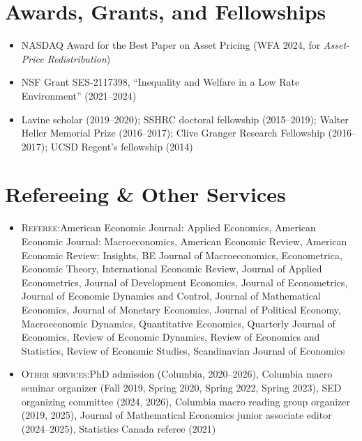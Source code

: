 \documentclass[a4paper,10pt]{article}
\newcommand{\note}[1]{\par\nopagebreak{\small\leftskip=1em #1\par}}
\begin{document}
\section*{Awards, Grants, and Fellowships}
\begin{itemize}[itemsep=4pt]
  \item NASDAQ Award for the Best Paper on Asset Pricing (WFA 2024, for \textit{Asset-Price Redistribution})
  \item NSF Grant SES-2117398, ``Inequality and Welfare in a Low Rate Environment'' (2021--2024)
        \note{with co-PI Matthieu Gomez}
  \item Lavine scholar (2019--2020); SSHRC doctoral fellowship (2015--2019); Walter Heller Memorial Prize (2016--2017); Clive Granger Research Fellowship (2016--2017); UCSD Regent's fellowship (2014)
\end{itemize}

\section*{Refereeing \& Other Services}
\begin{itemize}[itemsep=4pt]
  \item \textsc{Referee:}\enspace American Economic Journal: Applied Economics, American Economic Journal: Macroeconomics, American Economic Review, American Economic Review: Insights, BE Journal of Macroeconomics, Econometrica, Economic Theory, International Economic Review, Journal of Applied Econometrics, Journal of Development Economics, Journal of Econometrics, Journal of Economic Dynamics and Control, Journal of Mathematical Economics, Journal of Monetary Economics, Journal of Political Economy, Macroeconomic Dynamics, Quantitative Economics, Quarterly Journal of Economics, Review of Economic Dynamics, Review of Economics and Statistics, Review of Economic Studies, Scandinavian Journal of Economics
  \item \textsc{Other services:}\enspace PhD admission (Columbia, 2020--2026), Columbia macro seminar organizer (Fall 2019, Spring 2020, Spring 2022, Spring 2023), SED organizing committee (2024, 2026), Columbia macro reading group organizer (2019, 2025), Journal of Mathematical Economics junior associate editor (2024--2025), Statistics Canada referee (2021)
\end{itemize}
\end{document}
